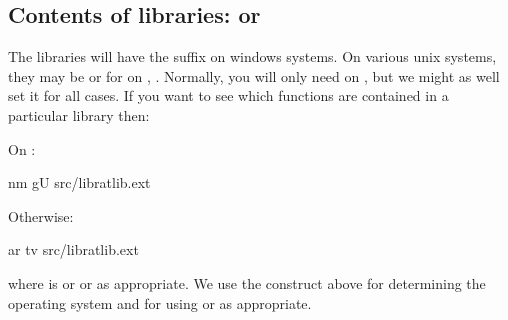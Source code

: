 \documentclass[letterpaper,10pt,english]{sphinxmanual}
\begin{document}
\subsection{Contents of libraries:  or }
\label{\detokenize{Appendix1:Contents-of-libraries:-nm-or-ar}}
The libraries will have the suffix  on windows systems. On various unix systems, they may be  or for on , . Normally, you will only need  on , but we might as well set it for all
cases. If you want to see which functions are contained in a particular library then:

On :

\begin{sphinxVerbatim}[commandchars=\\\{\}]
nm \PYGZhy{}gU  src/libratlib.\PYGZdl{}\PYGZob{}ext\PYGZcb{}
\end{sphinxVerbatim}

Otherwise:

\begin{sphinxVerbatim}[commandchars=\\\{\}]
ar tv src/libratlib.\PYGZdl{}\PYGZob{}ext\PYGZcb{}
\end{sphinxVerbatim}

where  is  or  or  as appropriate. We use the construct above for determining the operating system and for using  or  as appropriate.
\end{document}
